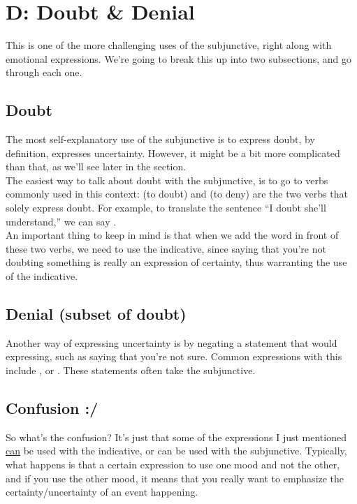 \section{D: Doubt \& Denial}

This is one of the more challenging uses of the subjunctive, right along with emotional expressions. We're going to break this up into two subsections, and go through each one. 

\subsection{Doubt}

The most self-explanatory use of the subjunctive is to express doubt, by definition, expresses uncertainty. However, it might be a bit more complicated than that, as we'll see later in the section. \\

The easiest way to talk about doubt with the subjunctive, is to go to verbs commonly used in this context:  (to doubt) and  (to deny) are the two verbs that solely express doubt. For example, to translate the sentence ``I doubt she'll understand,'' we can say . \\

An important thing to keep in mind is that when we add the word  in front of these two verbs, we need to use the indicative, since saying that you're not doubting something is really an expression of certainty, thus warranting the use of the indicative.
\subsection{Denial (subset of doubt)}

Another way of expressing uncertainty is by negating a statement that would expressing, such as saying that you're not sure. Common expressions with this include ,  or . These statements often take the subjunctive. \\


\subsection{Confusion :/}

So what's the confusion? It's just that some of the expressions I just mentioned \underline{can} be used with the indicative, or can be used with the subjunctive. Typically, what happens is that a certain expression  to use one mood and not the other, and if you use the other mood, it means that you really want to emphasize the certainty/uncertainty of an event happening. \\

